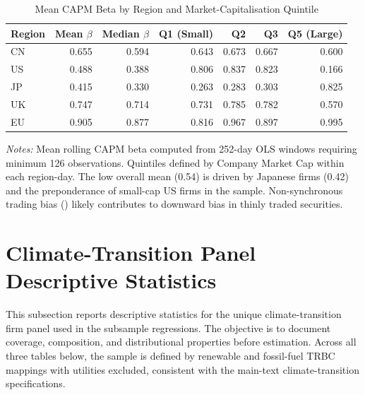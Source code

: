 \documentclass{article}
\theoremstyle{plain}
\begin{document}
\begin{table}[htbp]
\centering
\caption{Mean CAPM Beta by Region and Market-Capitalisation Quintile}
\label{tab:beta_region_mktcap}
\begin{threeparttable}
\small
\begin{tabular}{l r r r r r r}
\toprule
Region & Mean $\beta$ & Median $\beta$ & Q1 (Small) & Q2 & Q3 & Q5 (Large) \\
\midrule
CN & 0.655 & 0.594 & 0.643 & 0.673 & 0.667 & 0.600 \\
US & 0.488 & 0.388 & 0.806 & 0.837 & 0.823 & 0.166 \\
JP & 0.415 & 0.330 & 0.263 & 0.283 & 0.303 & 0.825 \\
UK & 0.747 & 0.714 & 0.731 & 0.785 & 0.782 & 0.570 \\
EU & 0.905 & 0.877 & 0.816 & 0.967 & 0.897 & 0.995 \\
\bottomrule
\end{tabular}
\begin{tablenotes}\small
\item \textit{Notes:} Mean rolling CAPM beta computed from 252-day OLS windows requiring minimum 126 observations. Quintiles defined by Company Market Cap within each region-day. The low overall mean (0.54) is driven by Japanese firms (0.42) and the preponderance of small-cap US firms in the sample. Non-synchronous trading bias (\cite{ScholesWilliams1977}) likely contributes to downward bias in thinly traded securities.
\end{tablenotes}
\end{threeparttable}
\end{table}

\FloatBarrier
\section{Climate-Transition Panel Descriptive Statistics}
\label{sec:appendix_climate}

This subsection reports descriptive statistics for the unique climate-transition firm panel used in the subsample regressions. The objective is to document coverage, composition, and distributional properties before estimation. Across all three tables below, the sample is defined by renewable and fossil-fuel TRBC mappings with utilities excluded, consistent with the main-text climate-transition specifications.
\end{document}
